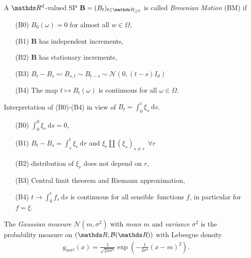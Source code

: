 \begin{defi}
A $\Rd$-valued SP $\textbf{B}=(B_t)_{t \in \R_{\geq 0}}$ is called \emph{Brownian Motion} (BM) if 
\begin{enumerate}
\item[(B0)] $B_0(\omega)=0$ for almost all $w\in \Omega$,
\item[(B1)] $\textbf{B}$ has independent increments,
\item[(B2)] $\textbf{B}$ has stationary increments,
\item[(B3)] $B_t-B_s\eqqcolon B_{s,t}\sim B_{t-s}\sim \mathcal{N}(0,(t-s)I_d)$
\item[(B4)] The map $t\mapsto B_t(\omega)$ is continuous for all $\omega \in \Omega$.
\end{enumerate}
\end{defi}

\begin{bem}
Interpretation of (B0)-(B4) in view of $B_t=\int_0^t \xi_s~\mathrm{d}s$.
\begin{enumerate}
\item[(B0)] $\int_0^0\xi_s~\mathrm{d}s=0$,
\item[(B1)] $B_t-B_s=\int_s^t \xi_r~\mathrm{d}r$ and $\xi_r \amalg (\xi_s)_{s\not =r}~~\forall r$
\item[(B2)] distribution of $\xi_r$ does not depend on $r$,
\item[(B3)] Central limit theorem and Riemann approximation,
\item[(B4)] $t\to \int_0^t f_s~\mathrm{d}s$ is continuous for all \glqq sensible\grqq\, functions $f$, in particular for $f=\xi$.
\end{enumerate}
\end{bem}

\begin{defi}
The \emph{Gaussian measure} $\mathcal{N}(m,\sigma^2)$ with \emph{mean} $m$ and \emph{variance} $\sigma^2$ is the probability measure on
$(\R,\mathcal{B}(\R))$ with Lebesgue density
\begin{align*}
g_{m\sigma^2}(x)=\frac{1}{\sqrt{2\pi \sigma^2}} \exp\left(-\frac{1}{2\sigma^2}(x-m)^2\right).
\end{align*}
\end{defi}

